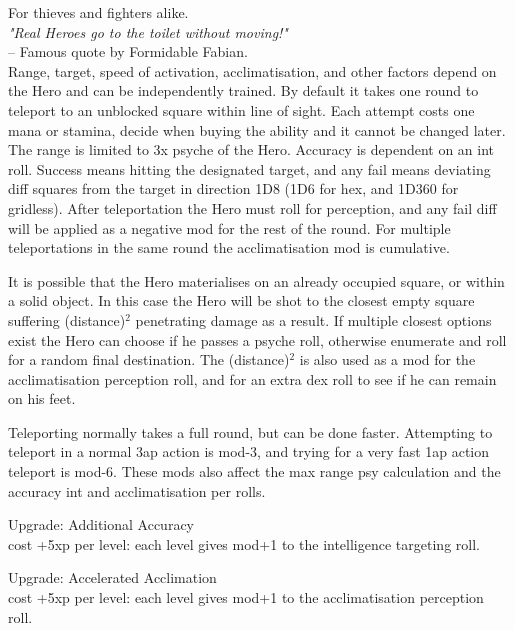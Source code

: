  For thieves and fighters alike.\\
\emph{"Real Heroes go to the toilet without moving!"}\\
-- Famous quote by Formidable Fabian.\\
Range, target, speed of activation, acclimatisation, and other factors depend on the Hero and can be independently trained. By default it takes one round to teleport to an unblocked square within line of sight. Each attempt costs one mana or stamina, decide when buying the ability and it cannot be changed later. The range is limited to 3x psyche of the Hero. Accuracy is dependent on an int roll. Success means hitting the designated target, and any fail means deviating diff squares from the target in direction 1D8 (1D6 for hex, and 1D360 for gridless). After teleportation the Hero must roll for perception, and any fail diff will be applied as a negative mod for the rest of the round. For multiple teleportations in the same round the acclimatisation mod is cumulative.

It is possible that the Hero materialises on an already occupied square, or within a solid object. In this case the Hero will be shot to the closest empty square suffering (distance)$^2$ penetrating damage as a result. If multiple closest options exist the Hero can choose if he passes a psyche roll, otherwise enumerate and roll for a random final destination. The (distance)$^2$ is also used as a mod for the acclimatisation perception roll, and for an extra dex roll to see if he can remain on his feet.

Teleporting normally takes a full round, but can be done faster. Attempting to teleport in a normal 3ap action is mod-3, and trying for a very fast 1ap action teleport is mod-6. These mods also affect the max range psy calculation and the accuracy int and acclimatisation per rolls. %

Upgrade: Additional Accuracy\\
cost +5xp per level: each level gives mod+1 to the intelligence targeting roll.

Upgrade: Accelerated Acclimation\\
cost +5xp per level: each level gives mod+1 to the acclimatisation perception roll.

